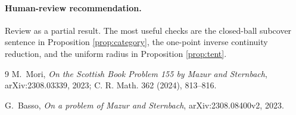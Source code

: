 \documentclass[11pt]{article}
\begin{document}
\paragraph{Human-review recommendation.}
Review as a partial result.  The most useful checks are the closed-ball
subcover sentence in Proposition \ref{prop:category}, the one-point inverse
continuity reduction, and the uniform radius in Proposition
\ref{prop:tent}.

\begin{thebibliography}{9}
M.~Mori,
\emph{On the Scottish Book Problem 155 by Mazur and Sternbach},
arXiv:2308.03339, 2023; C. R. Math. 362 (2024), 813--816.

G.~Basso,
\emph{On a problem of Mazur and Sternbach},
arXiv:2308.08400v2, 2023.
\end{thebibliography}
\end{document}
